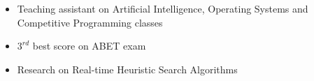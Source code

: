\documentclass[10pt,a4paper]{altacv}
\begin{document}
\begin{paracol}{2}
\divider
{}

\begin{itemize}
  \item Teaching assistant on Artificial Intelligence, Operating Systems and Competitive Programming classes
  \item $3^{rd}$ best score on ABET exam
  \item Research on Real-time Heuristic Search Algorithms
\end{itemize}

\end{paracol}
\end{document}
